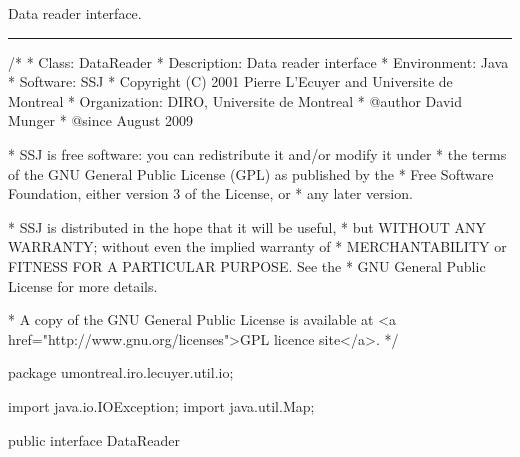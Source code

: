 
Data reader interface.

\bigskip\hrule

\begin{code}
\begin{hide}
/*
 * Class:        DataReader
 * Description:  Data reader interface
 * Environment:  Java
 * Software:     SSJ 
 * Copyright (C) 2001  Pierre L'Ecuyer and Universite de Montreal
 * Organization: DIRO, Universite de Montreal
 * @author       David Munger 
 * @since        August 2009

 * SSJ is free software: you can redistribute it and/or modify it under
 * the terms of the GNU General Public License (GPL) as published by the
 * Free Software Foundation, either version 3 of the License, or
 * any later version.

 * SSJ is distributed in the hope that it will be useful,
 * but WITHOUT ANY WARRANTY; without even the implied warranty of
 * MERCHANTABILITY or FITNESS FOR A PARTICULAR PURPOSE.  See the
 * GNU General Public License for more details.

 * A copy of the GNU General Public License is available at
   <a href="http://www.gnu.org/licenses">GPL licence site</a>.
 */
\end{hide}
package umontreal.iro.lecuyer.util.io;
\begin{hide}
import java.io.IOException;
import java.util.Map;
\end{hide}

public interface DataReader \begin{hide} {
\end{hide}
\end{code}

